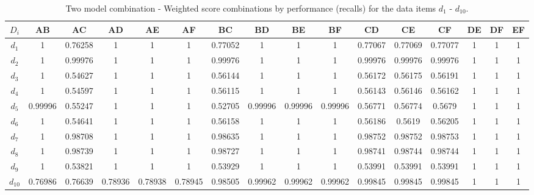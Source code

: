 \begin{table*}[t]
\caption{Two model combination - Weighted score combinations by performance (recalls) for the data items $d_{1}$ - $d_{10}$.}
\label{tab:wgt_score_comb_by_perf_recall}
\centering
\begin{adjustbox}{width=\textwidth}
\begin{tabular}{|c|c|c|c|c|c|c|c|c|c|c|c|c|c|c|c|}
\hline
$D_i$ & AB & AC & AD & AE & AF & BC & BD & BE & BF & CD & CE & CF & DE & DF & EF \\ 
\hline
$d_{1}$ & 1 & 0.76258 & 1 & 1 & 1 & 0.77052 & 1 & 1 & 1 & 0.77067 & 0.77069 & 0.77077 & 1 & 1 & 1 \\
$d_{2}$ & 1 & 0.99976 & 1 & 1 & 1 & 0.99976 & 1 & 1 & 1 & 0.99976 & 0.99976 & 0.99976 & 1 & 1 & 1 \\
$d_{3}$ & 1 & 0.54627 & 1 & 1 & 1 & 0.56144 & 1 & 1 & 1 & 0.56172 & 0.56175 & 0.56191 & 1 & 1 & 1 \\
$d_{4}$ & 1 & 0.54597 & 1 & 1 & 1 & 0.56115 & 1 & 1 & 1 & 0.56143 & 0.56146 & 0.56162 & 1 & 1 & 1 \\
$d_{5}$ & 0.99996 & 0.55247 & 1 & 1 & 1 & 0.52705 & 0.99996 & 0.99996 & 0.99996 & 0.56771 & 0.56774 & 0.5679 & 1 & 1 & 1 \\
$d_{6}$ & 1 & 0.54641 & 1 & 1 & 1 & 0.56158 & 1 & 1 & 1 & 0.56186 & 0.5619 & 0.56205 & 1 & 1 & 1 \\
$d_{7}$ & 1 & 0.98708 & 1 & 1 & 1 & 0.98635 & 1 & 1 & 1 & 0.98752 & 0.98752 & 0.98753 & 1 & 1 & 1 \\
$d_{8}$ & 1 & 0.98739 & 1 & 1 & 1 & 0.98727 & 1 & 1 & 1 & 0.98741 & 0.98744 & 0.98744 & 1 & 1 & 1 \\
$d_{9}$ & 1 & 0.53821 & 1 & 1 & 1 & 0.53929 & 1 & 1 & 1 & 0.53991 & 0.53991 & 0.53991 & 1 & 1 & 1 \\
$d_{10}$ & 0.76986 & 0.76639 & 0.78936 & 0.78938 & 0.78945 & 0.98505 & 0.99962 & 0.99962 & 0.99962 & 0.99845 & 0.99845 & 0.99845 & 1 & 1 & 1 \\
\hline
\end{tabular}
\end{adjustbox}
\end{table*}

